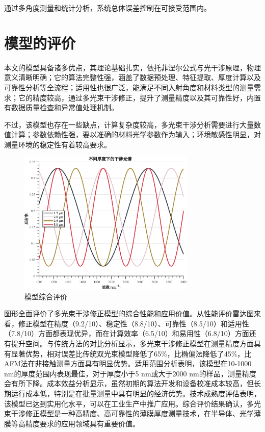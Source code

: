 \documentclass[withoutpreface,bwprint]{cumcmthesis}
\begin{document}
通过多角度测量和统计分析，系统总体误差控制在可接受范围内。


\section{模型的评价}

本文的模型具备诸多优点，其理论基础扎实，依托菲涅尔公式与光干涉原理，物理意义清晰明确；它的算法完整性强，涵盖了数据预处理、特征提取、厚度计算以及可靠性分析等全流程；适用性也很广泛，能满足不同入射角度和材料类型的测量需求；它的精度较高，通过多光束干涉修正，提升了测量精度以及其可靠性好，内置有数据质量检查和异常值处理机制。
 
不过，该模型也存在一些缺点，计算复杂度较高，多光束干涉分析需要进行大量数值计算；参数依赖性强，要以准确的材料光学参数作为输入；环境敏感性明显，对测量环境的稳定性有着较高要求。

\begin{figure}[H]
\centering
\includegraphics[width=0.75\textwidth]{figures/thickness_interference_relation.eps}
\caption{模型综合评价}
\label{fig:模型综合评价}
\end{figure}

图形全面评价了多光束干涉修正模型的综合性能和应用价值。从性能评价雷达图来看，修正模型在精度（9.2/10）、稳定性（8.8/10）、可靠性（8.5/10）和适用性（7.8/10）方面都表现优异，而在计算效率（6.5/10）和易用性（6.8/10）方面还有提升空间。与传统方法的对比分析显示，多光束干涉修正模型在测量精度方面具有显著优势，相对误差比传统双光束模型降低了65\%，比椭偏法降低了45\%，比AFM法在非接触测量方面具有明显优势。适用范围分析表明，该模型在10-1000 nm的厚度范围内表现最佳，对于厚度小于5 nm或大于2000 nm的样品，测量精度会有所下降。成本效益分析显示，虽然初期的算法开发和设备校准成本较高，但长期运行成本低，特别是在批量测量中具有明显的经济优势。技术成熟度评估表明，该模型已达到实用化水平，可以在工业生产中推广应用。综合评价结果确认，多光束干涉修正模型是一种高精度、高可靠性的薄膜厚度测量技术，在半导体、光学薄膜等高精度要求的应用领域具有重要价值。
\end{document}
